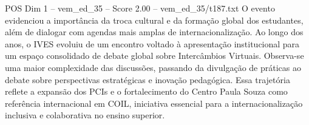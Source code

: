 \begin{textsample}{POS Dim 1 – vem\_ed\_35 – Score 2.00 – vem\_ed\_35/t187.txt}
O evento evidenciou a importância da troca cultural e da formação global dos estudantes, além de dialogar com agendas mais amplas de internacionalização.
Ao longo dos anos, o IVES evoluiu de um encontro voltado à apresentação institucional para um espaço consolidado de debate global sobre Intercâmbios Virtuais.
Observa-se uma maior complexidade das discussões, passando da divulgação de práticas ao debate sobre perspectivas estratégicas e inovação pedagógica.
Essa trajetória reflete a expansão dos PCIs e o fortalecimento do Centro Paula Souza como referência internacional em COIL, iniciativa essencial para a internacionalização inclusiva e colaborativa no ensino superior.

\end{textsample}
